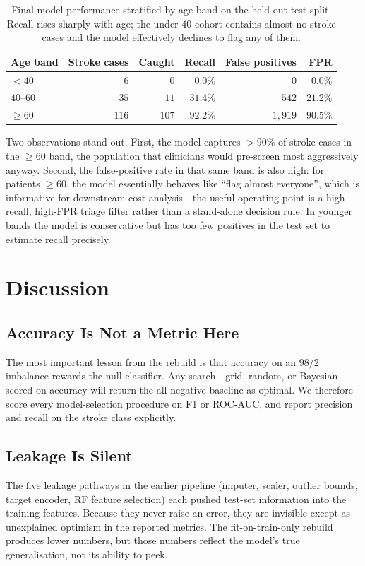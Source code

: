 \documentclass[pdflatex,sn-basic,Numbered]{sn-jnl}
\theoremstyle{thmstyleone}
\theoremstyle{thmstyletwo}
\theoremstyle{thmstylethree}
\begin{document}
\begin{table}[!htbp]
\centering
\caption{Final model performance stratified by age band on the
held-out test split. Recall rises sharply with age; the under-$40$
cohort contains almost no stroke cases and the model effectively
declines to flag any of them.}
\label{tab:age-band}
\begin{tabular}{@{}lrrrrr@{}}
\toprule
Age band & Stroke cases & Caught & Recall & False positives & FPR \\
\midrule
$<40$     & $6$   & $0$   & $0.0\%$  & $0$    & $0.0\%$  \\
$40$--$60$ & $35$  & $11$  & $31.4\%$ & $542$  & $21.2\%$ \\
$\geq 60$ & $116$ & $107$ & $92.2\%$ & $1{,}919$ & $90.5\%$ \\
\bottomrule
\end{tabular}
\end{table}

Two observations stand out. First, the model captures $>90\%$ of
stroke cases in the $\geq 60$ band, the population that clinicians
would pre-screen most aggressively anyway. Second, the false-positive
rate in that same band is also high: for patients $\geq 60$, the model
essentially behaves like ``flag almost everyone'', which is informative
for downstream cost analysis---the useful operating point is a
high-recall, high-FPR triage filter rather than a stand-alone decision
rule. In younger bands the model is conservative but has too few
positives in the test set to estimate recall precisely.

\section{Discussion}\label{sec:discussion}

\subsection{Accuracy Is Not a Metric Here}
The most important lesson from the rebuild is that accuracy on an $98/2$
imbalance rewards the null classifier. Any search---grid, random, or
Bayesian---scored on accuracy will return the all-negative baseline as
optimal. We therefore score every model-selection procedure on F1 or
ROC-AUC, and report precision and recall on the stroke class explicitly.

\subsection{Leakage Is Silent}
The five leakage pathways in the earlier pipeline (imputer, scaler,
outlier bounds, target encoder, RF feature selection) each pushed test-set
information into the training features. Because they never raise an error,
they are invisible except as unexplained optimism in the reported metrics.
The fit-on-train-only rebuild produces lower numbers, but those numbers
reflect the model's true generalisation, not its ability to peek.
\end{document}

